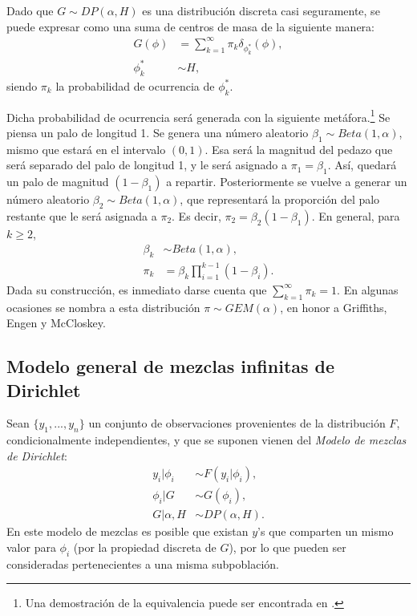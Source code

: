 Dado que $G \sim DP(\alpha,H)$  es una distribuci\'on discreta casi seguramente, se puede expresar como una suma de centros de masa de la siguiente manera:
\begin{equation*}
\begin{aligned}
G(\phi) &= \sum_{k=1}^\infty \pi_k \delta_{\phi_k^*}(\phi),\\
   \phi_k^* &\sim H,
\end{aligned}
\end{equation*}
siendo $\pi_k$ la probabilidad de ocurrencia de $\phi_k^*$.

Dicha probabilidad de ocurrencia ser\'a generada con la siguiente met\'afora.\footnote{Una demostraci\'on de la equivalencia puede ser encontrada en \cite{Paisley_SB}.} Se piensa un palo de longitud 1. Se genera una n\'umero aleatorio $\beta_1 \sim Beta(1,\alpha)$, mismo que estar\'a en el intervalo $(0,1)$. Esa ser\'a la magnitud del pedazo que ser\'a separado del palo de longitud 1, y le ser\'a asignado a $\pi_1 = \beta_1$. As\'i, quedar\'a un palo de magnitud $(1-\beta_1)$ a repartir. Posteriormente se vuelve a generar un n\'umero aleatorio $\beta_2 \sim Beta(1,\alpha)$, que representar\'a la proporci\'on del palo restante que le ser\'a asignada a $\pi_2$. Es decir, $\pi_2 = \beta_2(1-\beta_1)$. En general, para $k \geq 2$,
\begin{equation*}
\begin{aligned}
   \beta_k &\sim Beta(1,\alpha),\\
   \pi_k &= \beta_k \prod_{i=1}^{k-1}(1 - \beta_i).
\end{aligned}
\end{equation*}
Dada su construcci\'on, es inmediato darse cuenta que $\sum_{k=1}^\infty \pi_k = 1$. En algunas ocasiones se nombra a esta distribuci\'on $\pi \sim GEM(\alpha)$, en honor a Griffiths, Engen y McCloskey.

\subsection{Modelo general de mezclas infinitas de Dirichlet}

Sean $\{y_1,...,y_n\}$ un conjunto de observaciones provenientes de la distribuci\'on $F$, condicionalmente independientes, y que se suponen vienen del \textit{Modelo de mezclas de Dirichlet}:
\begin{equation*}
\begin{aligned}
   y_i | \phi_i &\sim F(y_i | \phi_i), \\
   \phi_i | G &\sim G(\phi_i), \\
   G | \alpha, H &\sim DP(\alpha,H).
\end{aligned}
\end{equation*}
En este modelo de mezclas es posible que existan $y$'s que comparten un mismo valor para $\phi_i$ (por la propiedad discreta de $G$), por lo que pueden ser consideradas pertenecientes a una misma subpoblaci\'on.


